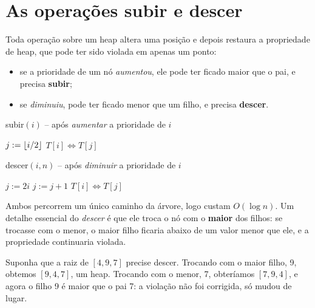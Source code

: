 \section{As operações subir e descer}\label{sec:subirdescer}
Toda operação sobre um heap altera uma posição e depois restaura a propriedade de heap, que pode ter sido violada em apenas um ponto:
\begin{itemize}
  \item se a prioridade de um nó \emph{aumentou}, ele pode ter ficado maior que o pai, e precisa \textbf{subir};
  \item se \emph{diminuiu}, pode ter ficado menor que um filho, e precisa \textbf{descer}.
\end{itemize}

\begin{pseudo}{subir$(i)$ -- após \emph{aumentar} a prioridade de $i$}
\begin{algorithmic}
  \State $j := \lfloor i/2\rfloor$
      \State $T[i]\Leftrightarrow T[j]$
      \State {}
    \EndIf
  \EndIf
\EndProcedure
\end{algorithmic}
\end{pseudo}
\begin{pseudo}{descer$(i,n)$ -- após \emph{diminuir} a prioridade de $i$}
\begin{algorithmic}
  \State $j := 2i$
      \State $j := j+1$ 
    \EndIf
      \State $T[i]\Leftrightarrow T[j]$
      \State {}
    \EndIf
  \EndIf
\EndProcedure
\end{algorithmic}
\end{pseudo}
Ambos percorrem um único caminho da árvore, logo custam $O(\log n)$. Um detalhe essencial do \emph{descer} é que ele troca o nó com o \textbf{maior} dos filhos: se trocasse com o menor, o maior filho ficaria abaixo de um valor menor que ele, e a propriedade continuaria violada.

\begin{exemplo}
Suponha que a raiz de $[4,9,7]$ precise descer. Trocando com o maior filho, 9, obtemos $[9,4,7]$, um heap. Trocando com o menor, 7, obteríamos $[7,9,4]$, e agora o filho 9 é maior que o pai 7: a violação não foi corrigida, só mudou de lugar.
\end{exemplo}


